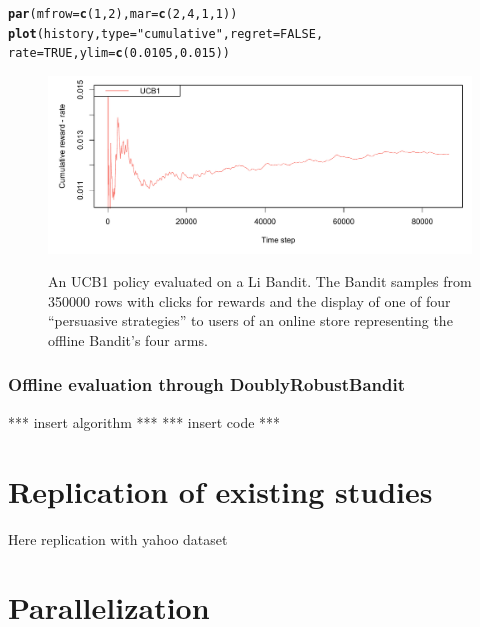 \documentclass[nojss]{jss}\usepackage[]{graphicx}\usepackage[]{color}
\makeatletter
\newcommand{\hlnum}[1]{\textcolor[rgb]{0.686,0.059,0.569}{#1}}%
\newcommand{\hlstr}[1]{\textcolor[rgb]{0.192,0.494,0.8}{#1}}%
\newcommand{\hlstd}[1]{\textcolor[rgb]{0.345,0.345,0.345}{#1}}%
\newcommand{\hlkwc}[1]{\textcolor[rgb]{0.333,0.667,0.333}{#1}}%
\newcommand{\hlkwd}[1]{\textcolor[rgb]{0.737,0.353,0.396}{\textbf{#1}}}%
\newenvironment{kframe}{%
 \def\at@end@of@kframe{}%
 \ifinner\ifhmode%
  \def\at@end@of@kframe{\end{minipage}}%
  \begin{minipage}{\columnwidth}%
 \fi\fi%
 \def\FrameCommand##1{\hskip\@totalleftmargin \hskip-\fboxsep
 \colorbox{shadecolor}{##1}\hskip-\fboxsep
     \hskip-\linewidth \hskip-\@totalleftmargin \hskip\columnwidth}%
 \MakeFramed {\advance\hsize-\width
   \@totalleftmargin\z@ \linewidth\hsize
   \@setminipage}}%
 {\par\unskip\endMakeFramed%
 \at@end@of@kframe}
\newenvironment{knitrout}{}{} %
\makeatother
\begin{document}
\begin{knitrout}
\begin{kframe}
\begin{alltt}
\hlkwd{par}\hlstd{(}\hlkwc{mfrow} \hlstd{=} \hlkwd{c}\hlstd{(}\hlnum{1}\hlstd{,} \hlnum{2}\hlstd{),} \hlkwc{mar} \hlstd{=} \hlkwd{c}\hlstd{(}\hlnum{2}\hlstd{,}\hlnum{4}\hlstd{,}\hlnum{1}\hlstd{,}\hlnum{1}\hlstd{))}
\hlkwd{plot}\hlstd{(history,} \hlkwc{type} \hlstd{=} \hlstr{"cumulative"}\hlstd{,} \hlkwc{regret} \hlstd{=} \hlnum{FALSE}\hlstd{,}
     \hlkwc{rate} \hlstd{=} \hlnum{TRUE}\hlstd{,} \hlkwc{ylim} \hlstd{=} \hlkwd{c}\hlstd{(}\hlnum{0.0105}\hlstd{,} \hlnum{0.015}\hlstd{))}
\end{alltt}
\end{kframe}
\end{knitrout}

\begin{figure}[H]
  \centering
    \includegraphics[width=.99\textwidth]{fig/ucb_offline}
    \label{fig:ucb_offline}
      \caption{An UCB1 policy evaluated on a Li Bandit. The Bandit samples from 350000 rows with clicks for rewards and the display of one of four “persuasive strategies” to users of an online store representing the offline Bandit's four arms.}
\end{figure}

\subsubsection{Offline evaluation through DoublyRobustBandit}

*** insert algorithm ***
*** insert code ***

\section{Replication of existing studies}

Here replication with yahoo dataset

\section{Parallelization}
\end{document}
